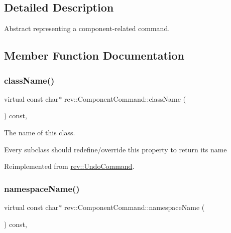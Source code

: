 \subsection{Detailed Description}
Abstract representing a component-\/related command. 

\subsection{Member Function Documentation}
\mbox{\label{classrev_1_1_component_command_a9fa769c52b149facb70c80bbc03a2be0}} 
\subsubsection{\texorpdfstring{className()}{className()}}
{\footnotesize\ttfamily virtual const char$\ast$ rev\+::\+Component\+Command\+::class\+Name (\begin{DoxyParamCaption}{ }\end{DoxyParamCaption}) const\hspace{0.3cm}{\ttfamily [inline]}, {\ttfamily [virtual]}}



The name of this class. 

Every subclass should redefine/override this property to return its name 

Reimplemented from \mbox{\hyperlink{classrev_1_1_undo_command_ab30f020732532e7cfd5472bdee65dcdb}{rev\+::\+Undo\+Command}}.

\mbox{\label{classrev_1_1_component_command_a7b4e11189228c9d9e5ff81598cb325f6}} 
\subsubsection{\texorpdfstring{namespaceName()}{namespaceName()}}
{\footnotesize\ttfamily virtual const char$\ast$ rev\+::\+Component\+Command\+::namespace\+Name (\begin{DoxyParamCaption}{ }\end{DoxyParamCaption}) const\hspace{0.3cm}{\ttfamily [inline]}, {\ttfamily [virtual]}}



